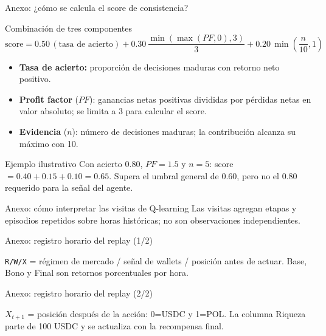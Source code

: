 \documentclass[10pt,aspectratio=169]{beamer}
\begin{document}
\begin{frame}{Anexo: ¿cómo se calcula el score de consistencia?}
\begin{block}{Combinación de tres componentes}
\[
\text{score}=0.50\,(\text{tasa de acierto})
+0.30\,\frac{\min(\max(PF,0),3)}{3}
+0.20\,\min\left(\frac{n}{10},1\right)
\]
\end{block}
\begin{itemize}\small
  \item \textbf{Tasa de acierto:} proporción de decisiones maduras con retorno neto positivo.
  \item \textbf{Profit factor} ($PF$): ganancias netas positivas divididas por pérdidas netas en valor absoluto; se limita a 3 para calcular el score.
  \item \textbf{Evidencia} ($n$): número de decisiones maduras; la contribución alcanza su máximo con 10.
\end{itemize}
\begin{exampleblock}{Ejemplo ilustrativo}
\small Con acierto $0.80$, $PF=1.5$ y $n=5$: score $=0.40+0.15+0.10=0.65$.
Supera el umbral general de $0.60$, pero no el $0.80$ requerido para la señal del agente.
\end{exampleblock}
\end{frame}

\begin{frame}{Anexo: cómo interpretar las visitas de Q-learning}
\centering\scriptsize
\QTablaVisitas
\vspace{.4em}
\footnotesize Las visitas agregan etapas y episodios repetidos sobre \ObservacionesRL{} horas históricas; no son observaciones independientes.
\end{frame}

\begin{frame}{Anexo: registro horario del replay (1/2)}
\centering
\scriptsize
\renewcommand{\arraystretch}{1.18}
\TablaReplayPrimera\par\vspace{.55em}
\footnotesize \texttt{R/W/X} = régimen de mercado / señal de wallets / posición antes de actuar. Base, Bono y Final son retornos porcentuales por hora.
\end{frame}

\begin{frame}{Anexo: registro horario del replay (2/2)}
\centering
\scriptsize
\renewcommand{\arraystretch}{1.18}
\TablaReplaySegunda\par\vspace{.55em}
\footnotesize $X_{t+1}$ = posición después de la acción: 0=USDC y 1=POL. La columna Riqueza parte de 100 USDC y se actualiza con la recompensa final.
\end{frame}
\end{document}

